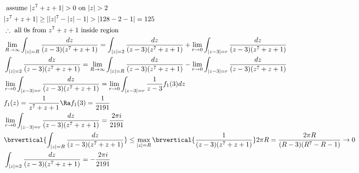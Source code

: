 \begin{align*}
    &\text{ assume }|z^7+z+1|>0\text{ on }|z|>2\\
    &|z^7+z+1|\geq||z|^7-|z|-1|>|128-2-1|=125\\
    &\therefore\ \text{all 0s from $z^7+z+1$ inside region}\\
    &\lim_{R\to\infty}\int_{|z|=R}\frac{dz}{(z-3)(z^7+z+1)}=\int_{|z|=2}\frac{dz}{(z-3)(z^7+z+1)}+\lim_{r\to0}\int_{|z-3|=r}\frac{dz}{(z-3)(z^7+z+1)}\\
    &\int_{|z|=2}\frac{dz}{(z-3)(z^7+z+1)}=\lim_{R\to\infty}\int_{|z|=R}\frac{dz}{(z-3)(z^7+z+1)}-\lim_{r\to0}\int_{|z-3|=r}\frac{dz}{(z-3)(z^7+z+1)}\\
    &\lim_{r\to0}\int_{|z-3|=r}\frac{dz}{(z-3)(z^7+z+1)}=\lim_{r\to0}\int_{|z-3|=r}\frac{1}{z-3}f_1(3)dz\\
    &f_1(z)=\frac{1}{z^7+z+1}\Ra f_1(3)=\frac{1}{2191}\\
    &\lim_{r\to0}\int_{|z-3|=r}\frac{dz}{(z-3)(z^7+z+1)}=\frac{2\pi i}{2191}\\
    &\brvertical{\int_{|z|=R}\frac{dz}{(z-3)(z^7+z+1)}}\leq\max_{|z|=R}\brvertical{\frac{1}{(z-3)(z^7+z+1)}}2\pi R=\frac{2\pi R}{(R-3)(R^7-R-1)}\to0\\
    &\int_{|z|=2}\frac{dz}{(z-3)(z^7+z+1)}=-\frac{2\pi i}{2191}
\end{align*}
